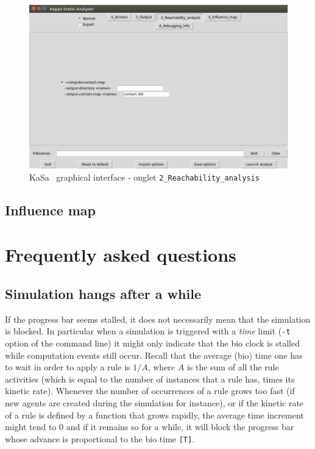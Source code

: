 \documentclass[11pt]{book}
\def\KaSa{\textsf{KaSa}}
\def\ttt#1{\texttt{#1}}
\begin{document}
\begin{figure}[htbp]
\centering
\includegraphics[width=12cm,natwidth=920pt,natheight=582pt]{img/kasa_2.png}
\caption{\KaSa~ graphical interface - onglet \texttt{2\_Reachability\_analysis}}
\label{fig:kasa:2}
\end{figure}


\section{Influence map}


\chapter{Frequently asked questions}
\section*{Simulation hangs after a while}
If the progress bar seems stalled, it does not necessarily mean that the simulation is blocked. In particular when a simulation is triggered with a \emph{time} limit (\ttt{-t} option of the command line) it might only indicate that the bio clock is stalled while computation events still occur. Recall that the average (bio) time one has to wait in order to apply a rule is $1/A$, where $A$ is the sum of all the rule activities (which is equal to the number of instances that a rule has, times its kinetic rate). Whenever the number of occurrences of a rule grows too fast (if new agents are created during the simulation for instance), or if the kinetic rate of a rule is defined by a function that grows rapidly, the average time increment might tend to 0 and if it remains so for a while, it will block the progress bar whose advance is proportional to the bio time \ttt{[T]}. 
\end{document}
